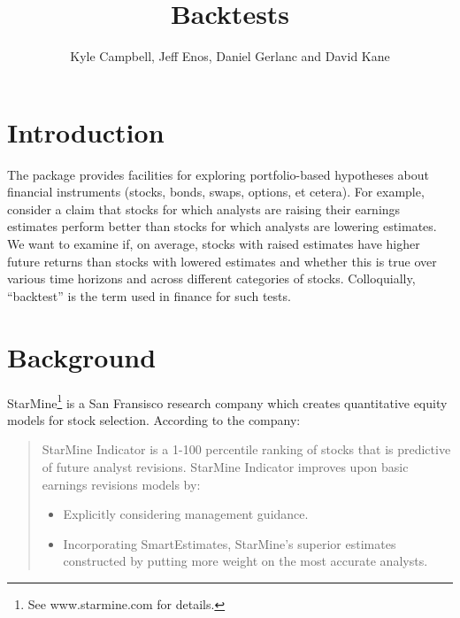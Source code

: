 \documentclass[a4paper]{report}
\begin{document}
\begin{article}
\title{Backtests}
\author{Kyle Campbell, Jeff Enos, Daniel Gerlanc and David Kane}



\maketitle


\section*{Introduction}

The  package provides facilities for exploring
portfolio-based hypotheses about financial instruments (stocks, bonds,
swaps, options, et cetera).  For example, consider a claim that stocks
for which analysts are raising their earnings estimates perform better
than stocks for which analysts are lowering estimates.  We want to
examine if, on average, stocks with raised estimates have higher
future returns than stocks with lowered estimates and whether this is
true over various time horizons and across different categories of
stocks.  Colloquially, ``backtest'' is the term used in finance for
such tests.

\section*{Background}

StarMine\footnote{See www.starmine.com for details.} is a San
Fransisco research company which creates quantitative equity models
for stock selection. According to the company:


\small

\begin{quote}
  StarMine Indicator is a 1-100 percentile ranking of stocks that is
  predictive of future analyst revisions. StarMine Indicator improves
  upon basic earnings revisions models by:

\begin{itemize}
\item Explicitly considering management guidance.
  
\item Incorporating SmartEstimates, StarMine's superior estimates
  constructed by putting more weight on the most accurate analysts.
  

\end{itemize}
\end{quote}
\end{article}
\end{document}
